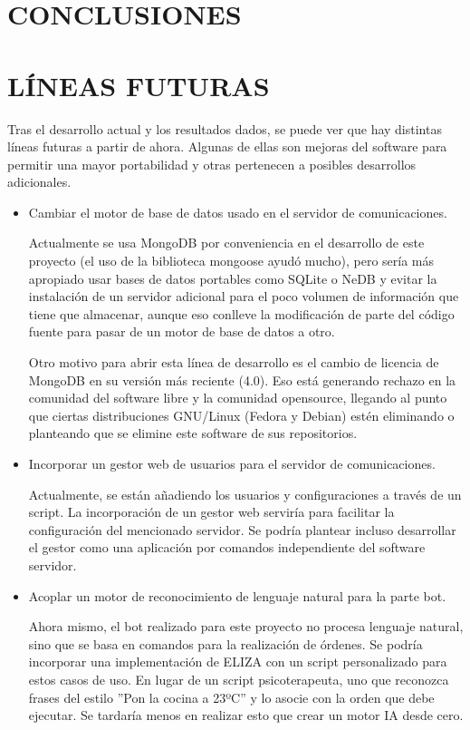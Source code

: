 \documentclass[spanish,12pt, a4paper, twoside]{paper}
\let\oldsection\section
\def\section{\cleardoublepage\oldsection}
\begin{document}
\section{CONCLUSIONES}

\section{LÍNEAS FUTURAS}

Tras el desarrollo actual y los resultados dados, se puede ver que hay distintas líneas futuras a partir de ahora. Algunas de ellas son mejoras del software para permitir una mayor portabilidad y otras pertenecen a posibles desarrollos adicionales.

\begin{itemize}
\item Cambiar el motor de base de datos usado en el servidor de comunicaciones. 

Actualmente se usa MongoDB por conveniencia en el desarrollo de este proyecto (el uso de la biblioteca mongoose ayudó mucho), pero sería más apropiado usar bases de datos portables como SQLite o NeDB  y evitar la instalación de un servidor adicional para el poco volumen de información que tiene que almacenar, aunque eso conlleve la modificación de parte del código fuente para pasar de un motor de base de datos a otro.

Otro motivo para abrir esta línea de desarrollo es el cambio de licencia de MongoDB en su versión más reciente (4.0). Eso está generando rechazo en la comunidad del software libre y la comunidad opensource, llegando al punto que ciertas distribuciones GNU/Linux (Fedora y Debian) estén eliminando o planteando que se elimine este software de sus repositorios. \cite{MongoDBLicense} \cite{MongoDBRemoveRequest}

\item Incorporar un gestor web de usuarios para el servidor de comunicaciones.

Actualmente, se están añadiendo los usuarios y configuraciones a través de un script. La incorporación de un gestor web serviría para facilitar la configuración del mencionado servidor. Se podría plantear incluso desarrollar el gestor como una aplicación por comandos independiente del software servidor.

\item Acoplar un motor de reconocimiento de lenguaje natural para la parte bot.

Ahora mismo, el bot realizado para este proyecto no procesa lenguaje natural, sino que se basa en comandos para la realización de órdenes. Se podría incorporar una implementación de ELIZA con un script personalizado para estos casos de uso. En lugar de un script psicoterapeuta, uno que reconozca frases del estilo ''Pon la cocina a 23ºC'' y lo asocie con la orden que debe ejecutar. Se tardaría menos en realizar esto que crear un motor IA desde cero.


\end{itemize}
\end{document}
